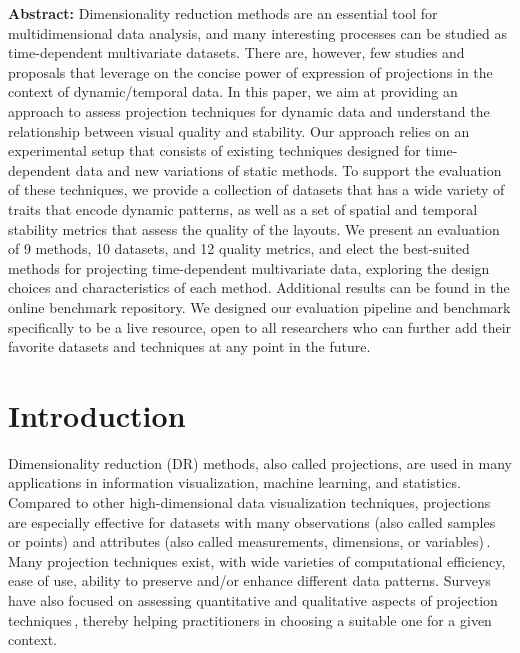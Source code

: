 \noindent \textbf{Abstract:}
Dimensionality reduction methods are an essential tool for multidimensional data analysis, and many interesting processes can be studied as time-dependent multivariate datasets. There are, however, few studies and proposals that leverage on the concise power of expression of projections in the context of dynamic/temporal data.  In this paper, we aim at providing an approach to assess projection techniques for dynamic data and understand the relationship between visual quality and stability. Our approach relies on an experimental setup that consists of existing techniques designed for time-dependent data and new variations of static methods. To support the evaluation of these techniques, we provide a collection of datasets that has a wide variety of traits that encode dynamic patterns, as well as a set of spatial and temporal stability metrics that assess the quality of the layouts.  We present an evaluation of 9 methods, 10 datasets, and 12 quality metrics, and elect the best-suited methods for projecting time-dependent multivariate data, exploring the design choices and characteristics of each method. Additional results can be found in the online benchmark repository. We designed our evaluation pipeline and benchmark specifically to be a live resource, open to all researchers who can further add their favorite datasets and techniques at any point in the future.

\section{Introduction}
%
Dimensionality reduction (DR) methods, also called projections, are used in many applications in information visualization, machine learning, and statistics. Compared to other high-dimensional data visualization techniques, projections are especially effective for datasets with many observations (also called samples or points) and attributes (also called measurements, dimensions, or variables)\,\citep{Liu2017}. Many projection techniques exist, with wide varieties of computational efficiency, ease of use, ability to preserve and/or enhance different data patterns. Surveys have also focused on assessing quantitative and qualitative aspects of projection techniques\,\citep{Nonato2019,vanderMaaten2009,Espadoto19}, thereby helping practitioners in choosing a suitable one for a given context.


